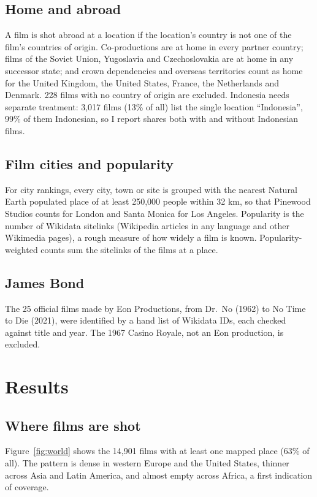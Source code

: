 \documentclass[11pt,a4paper]{article}
\begin{document}
\subsection{Home and abroad}
A film is shot abroad at a location if the location's country is not one of the film's countries of origin. Co-productions are at home in every partner country; films of the Soviet Union, Yugoslavia and Czechoslovakia are at home in any successor state; and crown dependencies and overseas territories count as home for the United Kingdom, the United States, France, the Netherlands and Denmark. 228 films with no country of origin are excluded. Indonesia needs separate treatment: 3,017 films (13\% of all) list the single location ``Indonesia'', 99\% of them Indonesian, so I report shares both with and without Indonesian films.

\subsection{Film cities and popularity}
For city rankings, every city, town or site is grouped with the nearest Natural Earth populated place of at least 250,000 people within 32 km, so that Pinewood Studios counts for London and Santa Monica for Los Angeles. Popularity is the number of Wikidata sitelinks (Wikipedia articles in any language and other Wikimedia pages), a rough measure of how widely a film is known. Popularity-weighted counts sum the sitelinks of the films at a place.

\subsection{James Bond}
The 25 official films made by Eon Productions, from Dr.\ No (1962) to No Time to Die (2021), were identified by a hand list of Wikidata IDs, each checked against title and year. The 1967 Casino Royale, not an Eon production, is excluded.

\section{Results}
\subsection{Where films are shot}
Figure~\ref{fig:world} shows the 14,901 films with at least one mapped place (63\% of all). The pattern is dense in western Europe and the United States, thinner across Asia and Latin America, and almost empty across Africa, a first indication of coverage.
\end{document}
